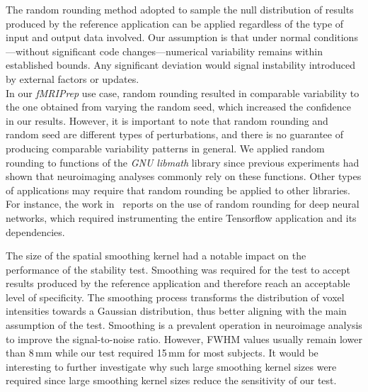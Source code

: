 \documentclass[lettersize,journal]{IEEEtran}
\newcommand{\fmriprep}{\emph{fMRIPrep}\xspace}
\newcommand{\add}[1]{\textcolor{green!60!black}{#1\\}} %
\begin{document}
The random rounding method adopted to sample the null distribution of results
produced by the reference application can be applied regardless of the type of
input and output data involved. \add{Our assumption is that under normal
  conditions—without significant code changes—numerical variability remains
  within established bounds. Any significant deviation would signal instability
  introduced by external factors or updates.} In our \fmriprep use case, random
rounding resulted in comparable variability to the one obtained from varying
the random seed, which increased the confidence in our results. However, it is
important to note that random rounding and random seed are different types of
perturbations, and there is no guarantee of producing comparable variability
patterns in general. We applied random rounding to functions of the \emph{GNU
  libmath} library since previous experiments had shown that neuroimaging
analyses commonly rely on these functions. Other types of applications may
require that random rounding be applied to other libraries. For instance, the
work in~\cite{gonzalez2024numerical} reports on the use of random rounding for
deep neural networks, which required instrumenting the entire Tensorflow
application and its dependencies.

The size of the spatial smoothing kernel had a notable impact on the
performance of the stability test. Smoothing was required for the test to
accept results produced by the reference application and therefore reach an
acceptable level of specificity. The smoothing process transforms the
distribution of voxel intensities towards a Gaussian distribution, thus better
aligning with the main assumption of the test. Smoothing is a prevalent
operation in neuroimage analysis to improve the signal-to-noise ratio. However,
FWHM values usually remain lower than 8\,mm while our test required 15\,mm for
most subjects. It would be interesting to further investigate why such large
smoothing kernel sizes were required since large smoothing kernel sizes reduce
the sensitivity of our test.
\end{document}
